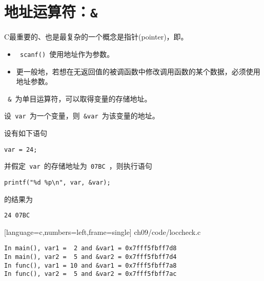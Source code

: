 \section{地址运算符：\lstinline|&|}
\begin{frame}[fragile]\ft{\secname}
C最重要的、也是最复杂的一个概念是指针(pointer)，即。

\end{frame}

\begin{frame}[fragile]\ft{\secname}
\begin{itemize}
\item
\lstinline| scanf() |使用地址作为参数。\\[0.1in]
\item
更一般地，若想在无返回值的被调函数中修改调用函数的某个数据，必须使用地址参数。
\end{itemize}
\end{frame}

\begin{frame}[fragile]\ft{\secname}
\lstinline| & |为单目运算符，可以取得变量的存储地址。 
\pause 
\vspace{0.4in}

设\lstinline| var |为一个变量，则\lstinline| &var |为该变量的地址。

\vspace{0.1in}


\end{frame}

\begin{frame}[fragile]\ft{\secname}
设有如下语句
\begin{lstlisting}
var = 24;
\end{lstlisting}
并假定\lstinline| var |的存储地址为\lstinline| 07BC |，则执行语句
\begin{lstlisting}
printf("%d %p\n", var, &var);
\end{lstlisting}
的结果为
\begin{lstlisting}
24 07BC
\end{lstlisting}
\end{frame}

\begin{frame}\ft{\secname}
  
  [language=c,numbers=left,frame=single]
  {ch09/code/loccheck.c}
\end{frame}


\begin{frame}[fragile]\ft{\secname}
\begin{lstlisting}[backgroundcolor=\color{red!10}]
In main(), var1 =  2 and &var1 = 0x7fff5fbff7d8
In main(), var2 =  5 and &var2 = 0x7fff5fbff7d4
In func(), var1 = 10 and &var1 = 0x7fff5fbff7a8
In func(), var2 =  5 and &var2 = 0x7fff5fbff7ac
\end{lstlisting}
\end{frame}

